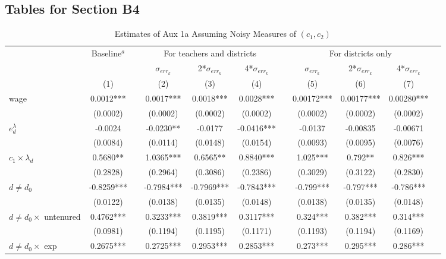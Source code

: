 \documentclass[notitlepage,12pt]{article}%
\begin{document}
\pagebreak\clearpage


\subsection*{Tables for Section B4}

\begin{table}[h]
\caption{Estimates of Aux 1a Assuming Noisy Measures of $(c_{1},c_{2})$}%
\label{tab_info}
\begin{center}
{\scriptsize
\begin{tabular}
[c]{lcccccccccc}\hline\hline
& Baseline$^{a}$ &  & \multicolumn{3}{c}{For teachers and districts} &  &
\multicolumn{3}{c}{For districts only} & \\\cline{2-2}\cline{4-6}\cline{8-10}
&  &  & $\sigma_{err_{k}}$ & 2*$\sigma_{err_{k}}$ & 4*$\sigma_{err_{k}}$ &  &
$\sigma_{err_{k}}$ & 2*$\sigma_{err_{k}}$ & 4*$\sigma_{err_{k}}$ & \\
& (1) &  & (2) & (3) & (4) &  & (5) & (6) & (7) & \\\hline
wage & 0.0012*** &  & 0.0017*** & 0.0018*** & 0.0028*** &  & 0.00172*** &
0.00177*** & 0.00280*** & \\
& (0.0002) &  & (0.0002) & (0.0002) & (0.0002) &  & (0.0002) & (0.0002) &
(0.0002) & \\
$e_{d}^{\lambda}$ & -0.0024 &  & -0.0230** & -0.0177 & -0.0416*** &  &
-0.0137 & -0.00835 & -0.00671 & \\
& (0.0084) &  & (0.0114) & (0.0148) & (0.0154) &  & (0.0093) & (0.0095) &
(0.0076) & \\
$c_{1}\times\lambda_{d}$ & 0.5680** &  & 1.0365*** & 0.6565** & 0.8840*** &  &
1.025*** & 0.792** & 0.826*** & \\
& (0.2828) &  & (0.2964) & (0.3086) & (0.2386) &  & (0.3029) & (0.3122) &
(0.2830) & \\
$d\neq d_{0}$ & -0.8259*** &  & -0.7984*** & -0.7969*** & -0.7843*** &  &
-0.799*** & -0.797*** & -0.786*** & \\
& (0.0122) &  & (0.0138) & (0.0135) & (0.0148) &  & (0.0138) & (0.0135) &
(0.0148) & \\
$d\neq d_{0} \times$ untenured & 0.4762*** &  & 0.3233*** & 0.3819*** &
0.3117*** &  & 0.324*** & 0.382*** & 0.314*** & \\
& (0.0981) &  & (0.1194) & (0.1195) & (0.1171) &  & (0.1193) & (0.1194) &
(0.1169) & \\
$d\neq d_{0} \times$ exp & 0.2675*** &  & 0.2725*** & 0.2953*** & 0.2853*** &
& 0.273*** & 0.295*** & 0.286*** & \\

\end{tabular}}
\end{center}
\end{table}
\end{document}

